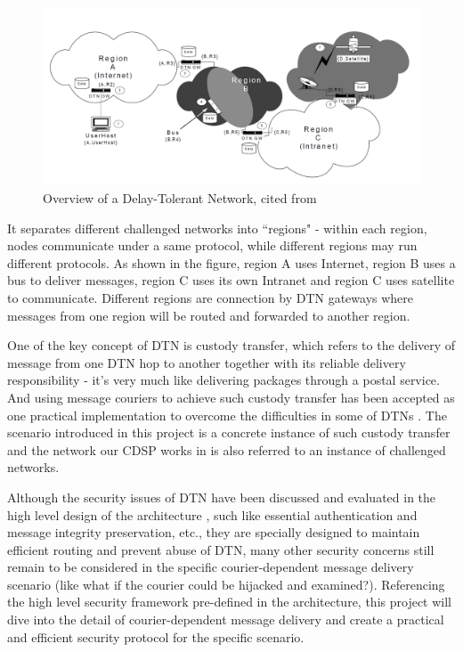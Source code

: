 \begin{figure}[h!]
\centering
\includegraphics[width=\textwidth,natwidth=1420,natheight=672]{figures/dtn.png}
\caption{Overview of a Delay-Tolerant Network, cited from \cite{Fall}}
\label{fig:dtn}
\end{figure}

It separates different challenged networks into ``regions" - within each region, nodes communicate under a same protocol, while different regions may run different protocols. As shown in the figure, region A uses Internet, region B uses a bus to deliver messages, region C uses its own Intranet and region C uses satellite to communicate. Different regions are connection by DTN gateways where messages from one region will be routed and forwarded to another region.

One of the key concept of DTN is custody transfer, which refers to the delivery of message from one DTN hop to another together with its reliable delivery responsibility - it's very much like delivering packages through a postal service. And using message couriers to achieve such custody transfer has been accepted as one practical implementation to overcome the difficulties in some of DTNs \cite{Jain}\cite{Zhao}. The scenario introduced in this project is a concrete instance of such custody transfer and the network our CDSP works in is also referred to an instance of challenged networks.

Although the security issues of DTN have been discussed and evaluated in the high level design of the architecture \cite{RFC4838}\cite{RFC5050}, such like essential authentication and message integrity preservation, etc., they are specially designed to maintain efficient routing and prevent abuse of DTN, many other security concerns still remain to be considered in the specific courier-dependent message delivery scenario (like what if the courier could be hijacked and examined?). Referencing the high level security framework pre-defined in the architecture, this project will dive into the detail of courier-dependent message delivery and create a practical and efficient security protocol for the specific scenario.

